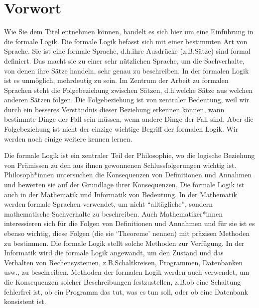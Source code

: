 \chapter{Vorwort}

Wie Sie dem Titel entnehmen können, handelt es sich hier um eine Einführung in die formale Logik. Die formale Logik befasst sich mit einer bestimmten Art von Sprache. Sie ist eine formale Sprache, d.h.\@ ihre Ausdrücke (z.B.\@ Sätze) sind formal definiert. Das macht sie zu einer sehr nützlichen Sprache, um die Sachverhalte, von denen ihre Sätze handeln, sehr genau zu beschreiben. In der formalen Logik ist es unmöglich, mehrdeutig zu sein. Im Zentrum der Arbeit zu formalen Sprachen steht die Folgebeziehung zwischen Sätzen, d.h.\@ welche Sätze aus welchen anderen Sätzen folgen. Die Folgebeziehung ist von zentraler Bedeutung, weil wir durch ein besseres Verständnis dieser Beziehung erkennen können, wann bestimmte Dinge der Fall sein müssen, wenn andere Dinge der Fall sind. Aber die Folgebeziehung ist nicht der einzige wichtige Begriff der formalen Logik. Wir werden noch einige weitere kennen lernen.

Die formale Logik ist ein zentraler Teil der Philosophie, wo die logische Beziehung von Prämissen zu den aus ihnen gewonnenen Schlussfolgerungen wichtig ist. Philosoph*innen untersuchen die Konsequenzen von Definitionen und Annahmen und bewerten sie auf der Grundlage ihrer Konsequenzen. Die formale Logik ist auch in der Mathematik und Informatik von Bedeutung. In der Mathematik werden formale Sprachen verwendet, um nicht ``alltägliche'', sondern mathematische Sachverhalte zu beschreiben. Auch Mathematiker*innen interessieren sich für die Folgen von Definitionen und Annahmen und für sie ist es ebenso wichtig, diese Folgen (die sie `Theoreme' nennen) mit präzisen Methoden zu bestimmen. Die formale Logik stellt solche Methoden zur Verfügung. In der Informatik wird die formale Logik angewandt, um den Zustand und das Verhalten von Rechensystemen, z.B.\@ Schaltkreisen, Programmen, Datenbanken usw.\@, zu beschreiben. Methoden der formalen Logik werden auch verwendet, um die Konsequenzen solcher Beschreibungen festzustellen, z.B.\@ ob eine Schaltung fehlerfrei ist, ob ein Programm das tut, was es tun soll, oder ob eine Datenbank konsistent ist.

